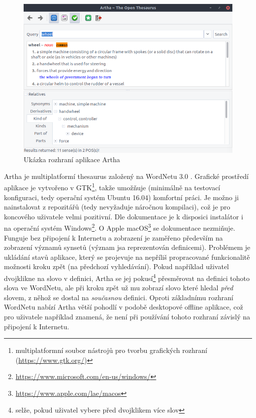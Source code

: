 \documentclass[a4paper, 11pt, oneside]{book}
\begin{document}
				\begin{figure}[h]
					\centering
					\includegraphics[width=1.0\textwidth]{wnartha-ubuntu.png}
					\caption{Ukázka rozhraní aplikace Artha}
					\label{fig:wnartha-ubuntu}
				\end{figure}

				Artha je multiplatformí thesaurus založený na WordNetu 3.0 \parencite{ramaswamy2012}. Grafické prostředí aplikace je vytvořeno v GTK\footnote{multiplatformní soubor nástrojů pro tvorbu grafických rozhraní (\url{https://www.gtk.org/})}, takže umožňuje (minimálně na testovací konfiguraci, tedy operační systém Ubuntu 16.04) komfortní práci. Je možno ji nainstalovat z repozitářů (tedy nevyžaduje náročnou kompilaci), což je pro koncového uživatele velmi pozitivní. Dle dokumentace je k disposici instalátor i na operační systém Windows\footnote{\url{https://www.microsoft.com/en-us/windows/}}. O Apple macOS\footnote{\url{https://www.apple.com/lae/macos}} se dokumentace nezmiňuje. Funguje bez připojení k Internetu a zobrazení je zaměřeno především na zobrazení významů synsetů (význam jsa reprezentován definicemi). Problémem je ukládání stavů aplikace, který se projevuje na nepříliš propracované funkcionalitě možnosti kroku zpět (na předchozí vyhledávání). Pokud například uživatel dvojklikne na slovo v definici, Artha se jej pokusí\footnote{selže, pokud uživatel vybere před dvojklikem více slov} přesměrovat na definici tohoto slova ve WordNetu, ale při kroku zpět už mu zobrazí slovo které hledal \textit{před} slovem, z něhož se dostal na \textit{současnou} definici. Oproti základnímu rozhraní WordNetu nabízí Artha větší pohodlí v podobě desktopové offline aplikace, což pro uživatele například znamená, že není při používání tohoto rozhraní závislý na připojení k Internetu.
\end{document}

